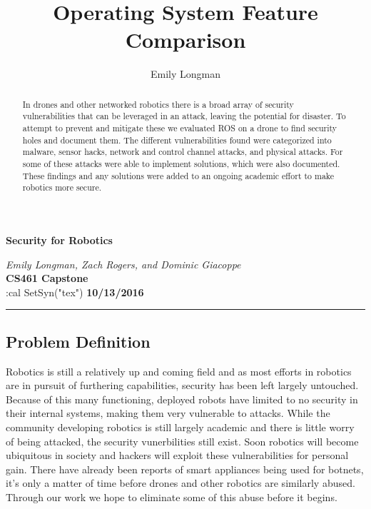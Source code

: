 \documentclass[IEEEtran,letterpaper,10pt,titlepage,draftclsnofoot,onecolumn]{article}
\title{Operating System Feature Comparison}
\author{Emily Longman}
\begin{document}
\begin{titlepage}
  \begin{center}
    \vspace*{1cm}
    
    \huge
    \textbf{Security for Robotics}      
  \vspace{0.5cm}
        
    \textit{Emily Longman, Zach Rogers, and Dominic Giacoppe}\\ 
  \vspace{0.5cm}
    \vfill
    \large
    \textbf{CS461 Capstone}\\ 
  \vspace{5mm}
:cal SetSyn("tex")
    \textbf{10/13/2016}\\ 
    
    \vfill
    \end{center}
\end{titlepage}

\begin{abstract}
In drones and other networked robotics there is a broad array of security vulnerabilities that can be leveraged in an attack, leaving the potential for disaster. 
To attempt to prevent and mitigate these we evaluated ROS on a drone to find security holes and document them. 
The different vulnerabilities found were categorized into malware, sensor hacks, network and control channel attacks, and physical attacks. 
For some of these attacks were able to implement solutions, which were also documented.
These findings and any solutions were added to an ongoing academic effort to make robotics more secure.
\end{abstract}

\hrule\vspace{5mm}
\subsection*{Problem Definition}
Robotics is still a relatively up and coming field and as most efforts in robotics are in pursuit of furthering capabilities, security has been left largely untouched. 
Because of this many functioning, deployed robots have limited to no security in their internal systems, making them very vulnerable to attacks.
While the community developing robotics is still largely academic and there is little worry of being attacked, the security vunerbilities still exist. 
Soon robotics will become ubiquitous in society and hackers will exploit these vulnerabilities for personal gain.
There have already been reports of smart appliances being used for botnets, it's only a matter of time before drones and other robotics are similarly abused.
Through our work we hope to eliminate some of this abuse before it begins.
\end{document}
